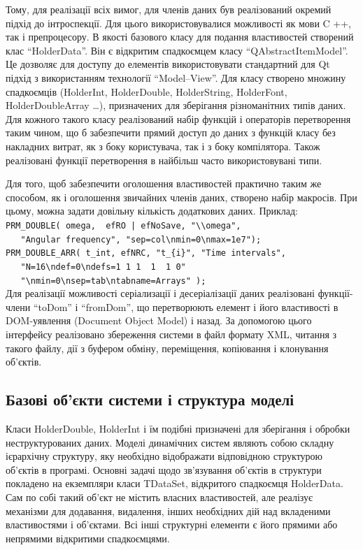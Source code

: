 Тому, для реалізації всіх вимог, для членів даних був
реалізований окремий підхід до інтроспекції. Для цього
використовувалися можливості як мови C ++, так і
препроцесору. В якості базового класу для подання властивостей
створений клас ``HolderData''. Він є відкритим спадкоємцем
класу ``QAbstractItemModel''. Це дозволяє для доступу до елементів
використовувати стандартний для Qt підхід з використанням
технології ``Model--View''. Для класу створено множину спадкоємців
(HolderInt, HolderDouble, HolderString, HolderFont, HolderDoubleArray \ldots), призначених для
зберігання різноманітних типів даних. Для кожного такого
класу реалізований набір функцій і операторів перетворення
таким чином, що б забезпечити прямий доступ до даних з функцій
класу без накладних витрат, як з боку користувача, так і з боку
компілятора. Також реалізовані функції перетворення в найбільш
часто використовувані типи.

Для того, щоб забезпечити оголошення властивостей практично
таким же способом, як і оголошення звичайних членів даних,
створено набір макросів. При цьому, можна задати довільну
кількість додаткових даних.
Приклад:\\
\verb!PRM_DOUBLE( omega,  efRO | efNoSave, "\\omega",! \\
\verb!   "Angular frequency", "sep=col\nmin=0\nmax=1e7");! \\
\verb!PRM_DOUBLE_ARR( t_int, efNRC, "t_{i}", "Time intervals",!\\
\verb!   "N=16\ndef=0\ndefs=1 1 1  1  1 0"! \\
\verb!   "\nmin=0\nsep=tab\ntabname=Arrays" );!\\

Для реалізації можливості серіализації і десеріалізації
даних реалізовані функції-члени ``toDom'' і ``fromDom'', що перетворюють
елемент і його властивості в DOM-уявлення (Document Object Model) і назад. За
допомогою цього інтерфейсу реалізовано збереження системи в
файл формату XML, читання з такого файлу, дії з буфером обміну,
переміщення, копіювання і клонування об'єктів.




\subsection{Базові об'єкти системи і структура моделі} %

Класи HolderDouble, HolderInt і їм подібні призначені для зберігання і
обробки неструктурованих даних. Моделі динамічних систем
являють собою складну ієрархічну структуру, яку необхідно
відображати відповідною структурою об'єктів в програмі. Основні
задачі щодо зв'язування об'єктів в структури покладено на
екземпляри класи TDataSet, відкритого спадкоємця HolderData. Сам по собі
такий об'єкт не містить власних властивостей, але реалізує
механізми для додавання, видалення, інших необхідних дій над
вкладеними властивостями і об'єктами. Всі інші структурні
елементи є його прямими або непрямими відкритими спадкоємцями.

